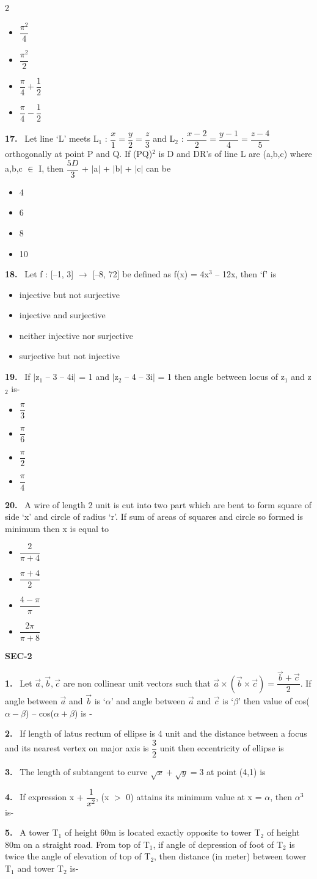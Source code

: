 \documentclass[10pt]{extarticle}
\newcommand{\sect}[1]{\par\smallskip\noindent\textbf{#1}\par}
\newcommand{\qn}[1]{\par\smallskip\noindent\textbf{#1.}~}
\newenvironment{qoptions}{\begin{itemize}[leftmargin=1.8em,itemsep=1pt,topsep=2pt,label={}]}{\end{itemize}}
\newcommand{\opt}[2]{\item[(#1)] #2}
\begin{document}
\begin{multicols}{2}
\begin{qoptions}
\opt{A}{$\dfrac{\pi^2}{4}$}
\opt{B}{$\dfrac{\pi^2}{2}$}
\opt{C}{$\dfrac{\pi}{4}+\dfrac{1}{2}$}
\opt{D}{$\dfrac{\pi}{4}-\dfrac{1}{2}$}
\end{qoptions}
\qn{17} Let line `L' meets L$_1$ : $\dfrac{x}{1}=\dfrac{y}{2}=\dfrac{z}{3}$ and L$_2$ : $\dfrac{x-2}{2}=\dfrac{y-1}{4}=\dfrac{z-4}{5}$ orthogonally at point P and Q. If (PQ)$^2$ is D and DR's of line L are (a,b,c) where a,b,c $\in$ I, then $\dfrac{5D}{3}$ + $|$a$|$ + $|$b$|$ + $|$c$|$ can be
\begin{qoptions}
\opt{A}{4}
\opt{B}{6}
\opt{C}{8}
\opt{D}{10}
\end{qoptions}
\qn{18} Let f : [--1, 3] $\rightarrow$ [--8, 72] be defined as f(x) = 4x$^3$ -- 12x, then `f' is
\begin{qoptions}
\opt{A}{injective but not surjective}
\opt{B}{injective and surjective}
\opt{C}{neither injective nor surjective}
\opt{D}{surjective but not injective}
\end{qoptions}
\qn{19} If $|$z$_1$ -- 3 -- 4i$|$ = 1 and $|$z$_2$ -- 4 -- 3i$|$ = 1 then angle between locus of z$_1$ and z$_2$ is-
\begin{qoptions}
\opt{A}{$\dfrac{\pi}{3}$}
\opt{B}{$\dfrac{\pi}{6}$}
\opt{C}{$\dfrac{\pi}{2}$}
\opt{D}{$\dfrac{\pi}{4}$}
\end{qoptions}
\qn{20} A wire of length 2 unit is cut into two part which are bent to form square of side `x' and circle of radius `r'. If sum of areas of squares and circle so formed is minimum then x is equal to
\begin{qoptions}
\opt{A}{$\dfrac{2}{\pi+4}$}
\opt{B}{$\dfrac{\pi+4}{2}$}
\opt{C}{$\dfrac{4-\pi}{\pi}$}
\opt{D}{$\dfrac{2\pi}{\pi+8}$}
\end{qoptions}
\sect{SEC-2}
\qn{1} Let $\vec{a},\vec{b},\vec{c}$ are non collinear unit vectors such that $\vec{a}\times(\vec{b}\times\vec{c}) = \dfrac{\vec{b}+\vec{c}}{2}$. If angle between $\vec{a}$ and $\vec{b}$ is `$\alpha$' and angle between $\vec{a}$ and $\vec{c}$ is `$\beta$' then value of cos($\alpha-\beta$) -- cos($\alpha+\beta$) is -
\qn{2} If length of latus rectum of ellipse is 4 unit and the distance between a focus and its nearest vertex on major axis is $\dfrac{3}{2}$ unit then eccentricity of ellipse is
\qn{3} The length of subtangent to curve $\sqrt{x}+\sqrt{y}=3$ at point (4,1) is
\qn{4} If expression x + $\dfrac{1}{x^2}$, (x $>$ 0) attains its minimum value at x = $\alpha$, then $\alpha^3$ is-
\qn{5} A tower T$_1$ of height 60m is located exactly opposite to tower T$_2$ of height 80m on a straight road. From top of T$_1$, if angle of depression of foot of T$_2$ is twice the angle of elevation of top of T$_2$, then distance (in meter) between tower T$_1$ and tower T$_2$ is-

\end{multicols}
\end{document}
